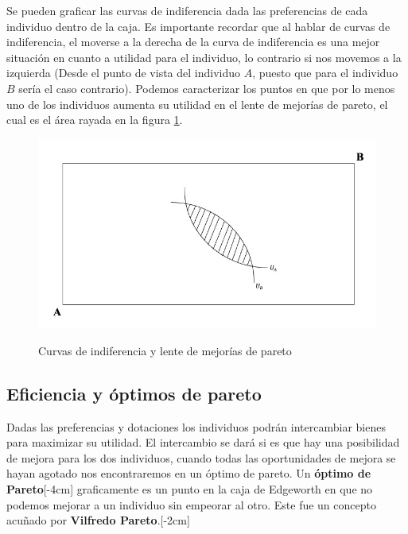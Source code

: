 Se pueden graficar las curvas de indiferencia dada las preferencias de cada individuo dentro de la caja. Es importante recordar que al hablar de curvas de indiferencia, el moverse a la derecha de la curva de indiferencia es una mejor situación en cuanto a utilidad para el individuo, lo contrario si nos movemos a la izquierda (Desde el punto de vista del individuo $A$, puesto que para el individuo $B$ sería el caso contrario). Podemos caracterizar los puntos en que por lo menos uno de los individuos aumenta su utilidad en el lente de mejorías de pareto, el cual es el área rayada en la figura \ref{fig:caja indiferencias}.
\begin{figure}[htbp]
    \centering
    \caption{Curvas de indiferencia y lente de mejorías de pareto}
    \includegraphics[width=\textwidth]{Figuras/EG Curvas de indiferencias.jpeg}
    \label{fig:caja indiferencias}
\end{figure}

\subsection{Eficiencia y óptimos de pareto}

Dadas las preferencias y dotaciones los individuos podrán intercambiar bienes para maximizar su utilidad. El intercambio se dará si es que hay una posibilidad de mejora para los dos individuos, cuando todas las oportunidades de mejora se hayan agotado nos encontraremos en un óptimo de pareto. Un \textbf{óptimo de Pareto}[-4cm] graficamente es un punto en la caja de Edgeworth en que no podemos mejorar a un individuo sin empeorar al otro. Este fue un concepto acuñado por \textbf{Vilfredo Pareto}.[-2cm]

